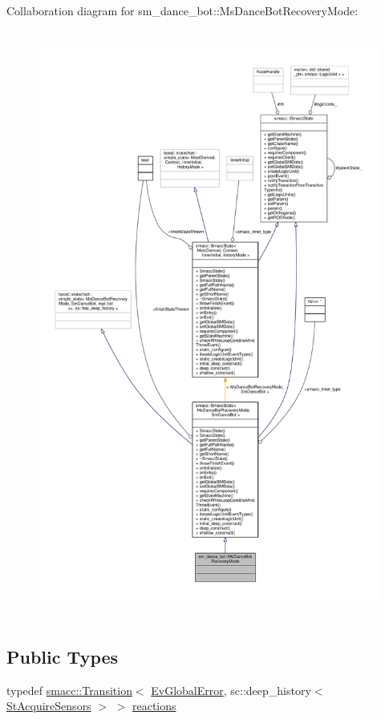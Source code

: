 Collaboration diagram for sm\+\_\+dance\+\_\+bot\+:\+:Ms\+Dance\+Bot\+Recovery\+Mode\+:\nopagebreak
\begin{figure}[H]
\begin{center}
\leavevmode
\includegraphics[height=550pt]{classsm__dance__bot_1_1MsDanceBotRecoveryMode__coll__graph}
\end{center}
\end{figure}
\subsection*{Public Types}
\begin{DoxyCompactItemize}
\item 
typedef \hyperlink{classsmacc_1_1Transition}{smacc\+::\+Transition}$<$ \hyperlink{structsm__dance__bot_1_1EvGlobalError}{Ev\+Global\+Error}, sc\+::deep\+\_\+history$<$ \hyperlink{structsm__dance__bot_1_1StAcquireSensors}{St\+Acquire\+Sensors} $>$ $>$ \hyperlink{classsm__dance__bot_1_1MsDanceBotRecoveryMode_ac97d2ec3eaa9201f352fbe40861f1c02}{reactions}
\end{DoxyCompactItemize}
